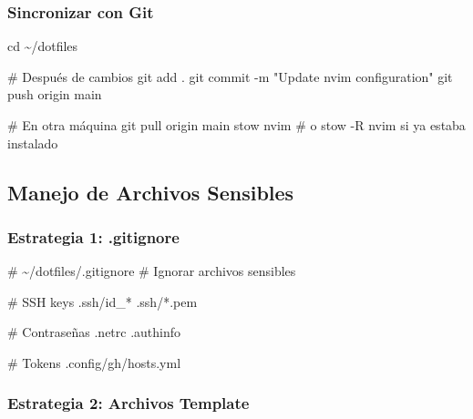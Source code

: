 \documentclass[
  doc,
  floatsintext,
  longtable,
  a4paper,
  nolmodern,
  notxfonts,
  notimes,
  12pt,
  colorlinks=true,linkcolor=blue,citecolor=blue,urlcolor=blue]{apa7}
\newenvironment{Shaded}{\begin{snugshade}}{\end{snugshade}}
\newcommand{\AttributeTok}[1]{\textcolor[rgb]{0.40,0.45,0.13}{#1}}
\newcommand{\BuiltInTok}[1]{\textcolor[rgb]{0.00,0.23,0.31}{#1}}
\newcommand{\CommentTok}[1]{\textcolor[rgb]{0.37,0.37,0.37}{#1}}
\newcommand{\ExtensionTok}[1]{\textcolor[rgb]{0.00,0.23,0.31}{#1}}
\newcommand{\FunctionTok}[1]{\textcolor[rgb]{0.28,0.35,0.67}{#1}}
\newcommand{\NormalTok}[1]{\textcolor[rgb]{0.00,0.23,0.31}{#1}}
\newcommand{\StringTok}[1]{\textcolor[rgb]{0.13,0.47,0.30}{#1}}
\begin{document}
\subsubsection{Sincronizar con Git}\label{sincronizar-con-git}

\begin{Shaded}
\begin{Highlighting}[]
\BuiltInTok{cd}\NormalTok{ \textasciitilde{}/dotfiles}

\CommentTok{\# Después de cambios}
\FunctionTok{git}\NormalTok{ add .}
\FunctionTok{git}\NormalTok{ commit }\AttributeTok{{-}m} \StringTok{"Update nvim configuration"}
\FunctionTok{git}\NormalTok{ push origin main}

\CommentTok{\# En otra máquina}
\FunctionTok{git}\NormalTok{ pull origin main}
\ExtensionTok{stow}\NormalTok{ nvim  }\CommentTok{\# o stow {-}R nvim si ya estaba instalado}
\end{Highlighting}
\end{Shaded}

\subsection{Manejo de Archivos
Sensibles}\label{manejo-de-archivos-sensibles}

\subsubsection{Estrategia 1: .gitignore}\label{estrategia-1-.gitignore}

\begin{Shaded}
\begin{Highlighting}[]
\CommentTok{\# \textasciitilde{}/dotfiles/.gitignore}
\CommentTok{\# Ignorar archivos sensibles}

\CommentTok{\# SSH keys}
\ExtensionTok{.ssh/id\_*}
\ExtensionTok{.ssh/*.pem}

\CommentTok{\# Contraseñas}
\ExtensionTok{.netrc}
\ExtensionTok{.authinfo}

\CommentTok{\# Tokens}
\ExtensionTok{.config/gh/hosts.yml}
\end{Highlighting}
\end{Shaded}

\subsubsection{Estrategia 2: Archivos
Template}\label{estrategia-2-archivos-template}
\end{document}
